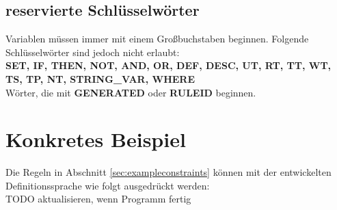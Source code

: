 \subsection{reservierte Schlüsselwörter}
\label{sec:keywords}
Variablen müssen immer mit einem Großbuchstaben beginnen. Folgende Schlüsselwörter sind jedoch nicht erlaubt:\\
 \textbf{SET, IF, THEN, NOT, AND, OR, DEF, DESC, UT, RT, TT, WT, TS, TP, NT, STRING\_VAR, WHERE}\\
Wörter, die mit \textbf{GENERATED} oder \textbf{RULEID} beginnen.

%
%
\section{Konkretes Beispiel}
Die Regeln in Abschnitt \ref{sec:exampleconstraints}  können mit der entwickelten Definitionssprache wie folgt ausgedrückt werden:\\
\color{red} TODO aktualisieren, wenn Programm fertig
\color{black}
\small
